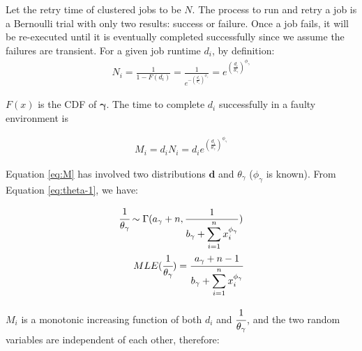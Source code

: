 \documentclass{IOS-Book-Article}
\begin{document}

Let the retry time of clustered jobs to be $N$. The process to run and retry a job is a Bernoulli trial with only two results: success or failure. Once a job fails, it will be re-executed until it is eventually completed successfully since we assume the failures are transient. For a given job runtime $d_i$, by definition:
\begin{eqnarray}
\displaystyle
N_i=\frac{1}{1-F(d_i)}=\frac{1}{e^{-(\displaystyle\frac{d_i}{\theta_{\gamma}})^{\phi_{\gamma}}}}=e^{(\displaystyle\frac{d_i}{\theta_{\gamma}})^{\phi_{\gamma}}} 
\label{eq:N}
\end{eqnarray}

$F(x)$ is the CDF of $\bm\gamma$. The time to complete $d_i$ successfully in a faulty environment is

\begin{eqnarray}
\displaystyle
M_i=d_iN_i=d_ie^{(\displaystyle\frac{d_i}{\theta_{\gamma}})^{\phi_{\gamma}}} 
\label{eq:M}
\end{eqnarray}

Equation \ref{eq:M} has involved two distributions $\bm d$ and $\theta_{\gamma}$ ($\phi_{\gamma}$ is known). From Equation \ref{eq:theta-1}, we have:

\begin{eqnarray}
\displaystyle\cfrac{1}{\theta_{\gamma}}\sim\Gamma(a_{\gamma}+n,\frac{1}{\displaystyle b_{\gamma}+\sum_{i=1}^n{x_i^{\phi_{\gamma}}}}) \\
MLE(\displaystyle\cfrac{1}{\theta_{\gamma}})=\displaystyle\cfrac{a_{\gamma}+n-1}{\displaystyle b_{\gamma}+\sum_{i=1}^n{x_i^{\phi_{\gamma}}}}
\label{eq:theta}
 \end{eqnarray}

$M_i$ is a monotonic increasing function of both $d_i$ and $\displaystyle\cfrac{1}{\theta_{\gamma}}$, and the two random variables are independent of each other, therefore:
\end{document}
